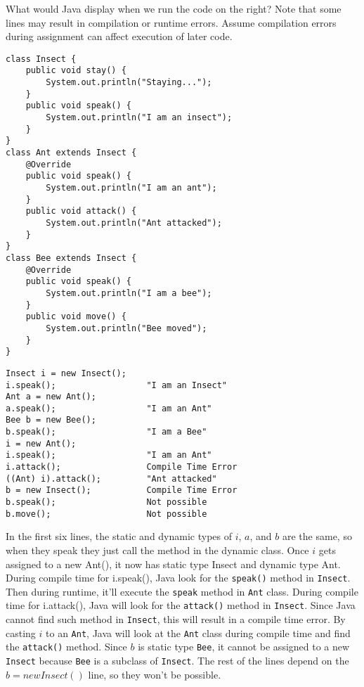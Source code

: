 \question What would Java display when we run the code on the right? Note that some
lines may result in compilation or runtime errors. Assume compilation errors during 
assignment can affect execution of later code.
\begin{lstlisting}
class Insect {
    public void stay() {
        System.out.println("Staying...");
    }
    public void speak() {
        System.out.println("I am an insect");
    }
}
class Ant extends Insect {
    @Override
    public void speak() {
        System.out.println("I am an ant");
    }
    public void attack() {
        System.out.println("Ant attacked");
    }
}
class Bee extends Insect {
    @Override
    public void speak() {
        System.out.println("I am a bee");
    }
    public void move() {
        System.out.println("Bee moved");
    }
}
\end{lstlisting} %
\begin{solution}
\begin{lstlisting}
Insect i = new Insect();
i.speak();                  "I am an Insect"
Ant a = new Ant();
a.speak();                  "I am an Ant"
Bee b = new Bee();
b.speak();                  "I am a Bee"
i = new Ant();
i.speak();                  "I am an Ant"
i.attack();                 Compile Time Error
((Ant) i).attack();         "Ant attacked"
b = new Insect();           Compile Time Error
b.speak();                  Not possible
b.move();                   Not possible
\end{lstlisting}

In the first six lines, the static and dynamic types of $i$, $a$, and $b$ are the same, so when they speak they just call the method in the dynamic class.  Once $i$ gets assigned to a new Ant(), it now has static type Insect and dynamic type Ant.  During compile time for i.speak(), Java look for the \lstinline$speak()$ method in \lstinline$Insect$.  Then during runtime, it'll execute the \lstinline$speak$ method in \lstinline$Ant$ class.  During compile time for i.attack(), Java will look for the \lstinline$attack()$ method in \lstinline$Insect$.  Since Java cannot find such method in \lstinline$Insect$, this will result in a compile time error.  By casting $i$ to an \lstinline$Ant$, Java will look at the \lstinline$Ant$ class during compile time and find the \lstinline$attack()$ method. Since $b$ is static type \lstinline$Bee$, it cannot be assigned to a new \lstinline$Insect$ because \lstinline$Bee$ is a subclass of \lstinline$Insect$.  The rest of the lines depend on the $b = new Insect()$ line, so they won't be possible.
\end{solution}